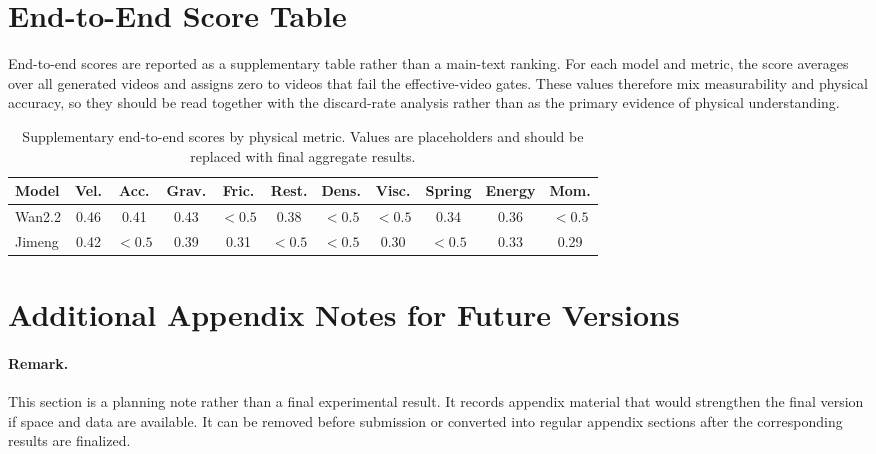 \documentclass{article}
\begin{document}
\section{End-to-End Score Table}
\label{app:end-to-end-scores}

End-to-end scores are reported as a supplementary table rather than a main-text ranking.
For each model and metric, the score averages over all generated videos and assigns zero to videos that fail the effective-video gates.
These values therefore mix measurability and physical accuracy, so they should be read together with the discard-rate analysis rather than as the primary evidence of physical understanding.

\begin{table}[H]
\centering
\scriptsize
\setlength{\tabcolsep}{3pt}
\caption{Supplementary end-to-end scores by physical metric. Values are placeholders and should be replaced with final aggregate results.}
\label{tab:end-to-end-scores}
\begin{tabular}{lcccccccccc}
\toprule
Model & Vel. & Acc. & Grav. & Fric. & Rest. & Dens. & Visc. & Spring & Energy & Mom. \\
\midrule
Wan2.2 & 0.46 & 0.41 & 0.43 & $<0.5$ & 0.38 & $<0.5$ & $<0.5$ & 0.34 & 0.36 & $<0.5$ \\
Jimeng & 0.42 & $<0.5$ & 0.39 & 0.31 & $<0.5$ & $<0.5$ & 0.30 & $<0.5$ & 0.33 & 0.29 \\
\bottomrule
\end{tabular}
\end{table}

\section{Additional Appendix Notes for Future Versions}
\label{app:future-notes}

\paragraph{Remark.}
This section is a planning note rather than a final experimental result.
It records appendix material that would strengthen the final version if space and data are available.
It can be removed before submission or converted into regular appendix sections after the corresponding results are finalized.
\end{document}
